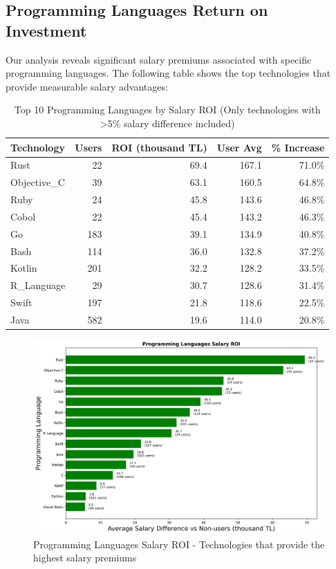 \documentclass[12pt,a4paper]{article}
\begin{document}
\subsection{Programming Languages Return on Investment}
Our analysis reveals significant salary premiums associated with specific programming languages. The following table shows the top technologies that provide measurable salary advantages:

\begin{table}[H]
\centering
\begin{tabular}{lrrrr}
\toprule
\textbf{Technology} & \textbf{Users} & \textbf{ROI (thousand TL)} & \textbf{User Avg} & \textbf{\% Increase} \\
\midrule
Rust & 22 & 69.4 & 167.1 & 71.0\% \\
Objective_C & 39 & 63.1 & 160.5 & 64.8\% \\
Ruby & 24 & 45.8 & 143.6 & 46.8\% \\
Cobol & 22 & 45.4 & 143.2 & 46.3\% \\
Go & 183 & 39.1 & 134.9 & 40.8\% \\
Bash & 114 & 36.0 & 132.8 & 37.2\% \\
Kotlin & 201 & 32.2 & 128.2 & 33.5\% \\
R_Language & 29 & 30.7 & 128.6 & 31.4\% \\
Swift & 197 & 21.8 & 118.6 & 22.5\% \\
Java & 582 & 19.6 & 114.0 & 20.8\% \\

\bottomrule
\end{tabular}
\caption{Top 10 Programming Languages by Salary ROI (Only technologies with >5\% salary difference included)}
\end{table}

\begin{figure}[H]
    \centering
    \includegraphics[width=\textwidth]{figures/barplot_programming_roi.png}
    \caption{Programming Languages Salary ROI - Technologies that provide the highest salary premiums}
\end{figure}
\end{document}
